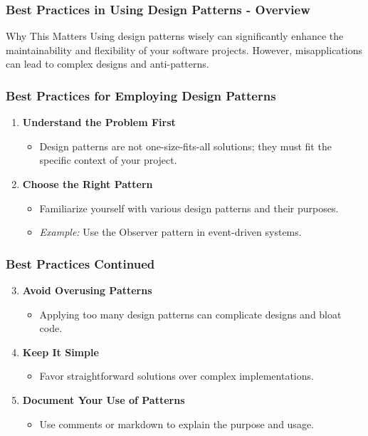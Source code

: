 \documentclass{beamer}
\begin{document}
\begin{frame}
    \frametitle{Best Practices in Using Design Patterns - Overview}
    \begin{block}{Why This Matters}
        Using design patterns wisely can significantly enhance the maintainability and flexibility of your software projects. However, misapplications can lead to complex designs and anti-patterns.
    \end{block}
\end{frame}

\begin{frame}
    \frametitle{Best Practices for Employing Design Patterns}
    \begin{enumerate}
        \item \textbf{Understand the Problem First}
            \begin{itemize}
                \item Design patterns are not one-size-fits-all solutions; they must fit the specific context of your project.
            \end{itemize}
            
        \item \textbf{Choose the Right Pattern}
            \begin{itemize}
                \item Familiarize yourself with various design patterns and their purposes.
                \item \textit{Example:} Use the Observer pattern in event-driven systems.
            \end{itemize}
    \end{enumerate}
\end{frame}

\begin{frame}
    \frametitle{Best Practices Continued}
    \begin{enumerate}
        \setcounter{enumi}{2}
        \item \textbf{Avoid Overusing Patterns}
            \begin{itemize}
                \item Applying too many design patterns can complicate designs and bloat code.
            \end{itemize}
        
        \item \textbf{Keep It Simple}
            \begin{itemize}
                \item Favor straightforward solutions over complex implementations.
            \end{itemize}
        
        \item \textbf{Document Your Use of Patterns}
            \begin{itemize}
                \item Use comments or markdown to explain the purpose and usage.
            \end{itemize}
    \end{enumerate}
\end{frame}
\end{document}
